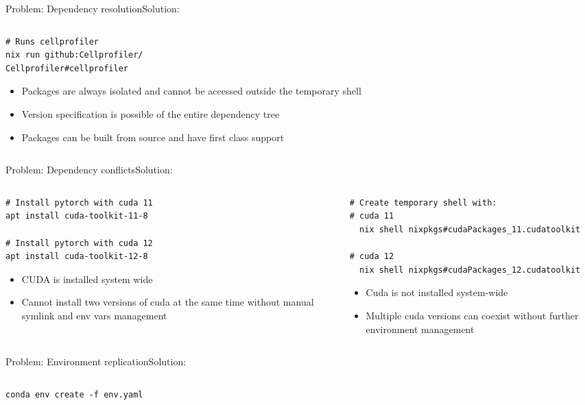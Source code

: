\documentclass[final]{beamer}
\begin{document}
\begin{frame}[label={sec:org2c7530c},fragile]{}
\begin{columns}
\begin{column}{0.33\columnwidth}
\begin{block}{Problem: Dependency resolution\hfill Solution:}
\begin{columns}
\begin{column}{0.5\columnwidth}
\begin{verbatim}
# Runs cellprofiler 
nix run github:Cellprofiler/
Cellprofiler#cellprofiler
\end{verbatim}
\begin{itemize}
\item Packages are always isolated and cannot be accessed outside the temporary shell
\item Version specification is possible of the entire dependency tree
\item Packages can be built from source and have first class support
\end{itemize}
\end{column}
\end{columns}
\end{block}
\begin{block}{Problem: Dependency conflicts\hfill Solution:}
\begin{columns}
\begin{column}{0.5\columnwidth}
\begin{verbatim}
# Install pytorch with cuda 11
apt install cuda-toolkit-11-8

# Install pytorch with cuda 12
apt install cuda-toolkit-12-8
\end{verbatim}

\begin{itemize}
\item CUDA is installed system wide
\item Cannot install two versions of cuda at the same time without manual symlink and env vars management
\end{itemize}
\end{column}
\begin{column}{0.5\columnwidth}
\begin{verbatim}
# Create temporary shell with:
# cuda 11
  nix shell nixpkgs#cudaPackages_11.cudatoolkit

# cuda 12
  nix shell nixpkgs#cudaPackages_12.cudatoolkit
\end{verbatim}

\begin{itemize}
\item Cuda is not installed system-wide
\item Multiple cuda versions can coexist without further environment management
\end{itemize}
\end{column}
\end{columns}
\end{block}
\begin{block}{Problem: Environment replication\hfill Solution:}
\begin{columns}
\begin{column}{0.5\columnwidth}
\begin{verbatim}
conda env create -f env.yaml
\end{verbatim}


\end{column}
\end{columns}
\end{block}
\end{column}
\end{columns}
\end{frame}
\end{document}
